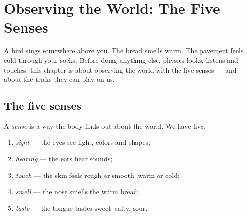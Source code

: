\chapter{Observing the World: The Five Senses}\label{ch:g1:five-senses}

A bird sings somewhere above you. The bread smells warm. The pavement
feels cold through your socks. Before doing anything else, physics
looks, listens and touches: this chapter is about observing the world
with the five senses --- and about the tricks they can play on us.

\section{The five senses}

\begin{definition}\label{def:g1:five-senses:senses}
A \emph{sense} is a way the body finds out about the
world. We have five:
\begin{enumerate}
  \item \emph{sight} --- the eyes see light, colors and
        shapes;
  \item \emph{hearing} --- the ears hear sounds;
  \item \emph{touch} --- the skin feels rough or smooth,
        warm or cold;
  \item \emph{smell} --- the nose smells the warm bread;
  \item \emph{taste} --- the tongue tastes sweet, salty,
        sour.
\end{enumerate}
\end{definition}

